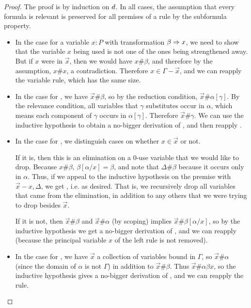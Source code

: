 \begin{proof}
The proof is by induction on $d$.  In all cases, the assumption that
every formula is relevant is preserved for all premises of a rule by the
subformula property.

\begin{itemize}
\item In the case for a variable $x:P$ with transformation $\beta \Rightarrow
  x$, we need to show that the variable $x$ being used is not one of the
  ones being strengthened away.  But if $x$ were in $\vec{x}$, then we
  would have $x \# \beta$, and therefore by the assumption, $x \# x$, a
  contradiction.  Therefore $x \in {\Gamma-\vec{x}}$, and we can reapply
  the variable rule, which has the same size.

\item In the case for \FR, we have $\vec{x} \# \beta$, so by the
  reduction condition, $\vec{x} \# \alpha[\gamma]$.  By the relevance
  condition, all variables that $\gamma$ substitutes occur in $\alpha$,
  which means each component of $\gamma$ occurs in $\alpha[\gamma]$.
  Therefore $\vec{x} \# \gamma$.  We can use the inductive hypothesis to
  obtain a no-bigger derivation of ,
  and then reapply \FR.

\item In the case for \FL, we distinguish cases on whether $x \in
  \vec{x}$ or not.

  If it is, then this is an elimination on a 0-use variable that we
  would like to drop.  Because $x \# \beta$, $\beta[\alpha/x] = \beta$,
  and note that $\Delta \# \beta$ because it occurs only in $\alpha$.
  Thus, if we appeal to the inductive hypothesis on the premise with
  $\vec{x}-x,\Delta$, we get
  , 
  i.e.
  as desired.  That is, we recursively drop all variables that came from
  the elimination, in addition to any others that we were trying to drop
  besides $\vec{x}$.  

  If it is not, then $\vec{x} \# \beta$ and $\vec{x} \# \alpha$ (by
  scoping) implies $\vec{x} \# \beta[\alpha/x]$, so by the inductive
  hypothesis we get a no-bigger derivation of
  , and we can
  reapply \FL (because the principal variable $x$ of the left rule is
  not removed).

\item In the case for \UR, we have $\vec{x}$ a collection of variables
  bound in $\Gamma$, so $\vec{x} \# \alpha$ (since the domain of
  $\alpha$ is not $\Gamma$) in addition to $\vec{x} \# \beta$.  Thus
  $\vec{x} \# \alpha{\beta}{x}$, so the inductive hypothesis gives a
  no-bigger derivation of
  , and we can reapply
  the rule.


\end{itemize}
\end{proof}
